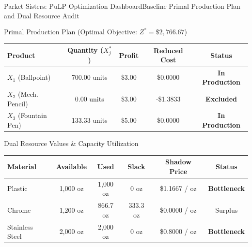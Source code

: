\documentclass{beamer}
\begin{document}
\begin{frame}{Parket Sisters: PuLP Optimization Dashboard}{Baseline Primal Production Plan and Dual Resource Audit}
    \begin{block}{Primal Production Plan (Optimal Objective: $Z^* = \$2,766.67$)}
        \centering
        \footnotesize
        \setlength{\tabcolsep}{4pt}
        \begin{tabular}{lcccc}
            \hline
            \textbf{Product} & \textbf{Quantity ($X_j^*$)} & \textbf{Profit} & \textbf{Reduced Cost} & \textbf{Status} \\
            \hline
            $X_1$ (Ballpoint)    & 700.00 units  & \$3.00 & \$0.0000  & \alert{\textbf{In Production}} \\
            $X_2$ (Mech. Pencil) & 0.00 units    & \$3.00 & -\$1.3833 & \textbf{Excluded} \\
            $X_3$ (Fountain Pen) & 133.33 units  & \$5.00 & \$0.0000  & \alert{\textbf{In Production}} \\
            \hline
        \end{tabular}
    \end{block}
    \vspace{0.1em}
    \begin{exampleblock}{Dual Resource Values \& Capacity Utilization}
        \centering
        \footnotesize
        \setlength{\tabcolsep}{4pt}
        \begin{tabular}{lccccc}
            \hline
            \textbf{Material} & \textbf{Available} & \textbf{Used} & \textbf{Slack} & \textbf{Shadow Price} & \textbf{Status} \\
            \hline
            Plastic          & 1,000 oz & 1,000 oz & 0 oz   & \$1.1667 / oz & \alert{\textbf{Bottleneck}} \\
            Chrome           & 1,200 oz & 866.7 oz & 333.3 oz & \$0.0000 / oz & Surplus \\
            Stainless Steel  & 2,000 oz & 2,000 oz & 0 oz   & \$0.8000 / oz & \alert{\textbf{Bottleneck}} \\
            \hline
        \end{tabular}
    \end{exampleblock}
\end{frame}
\end{document}
